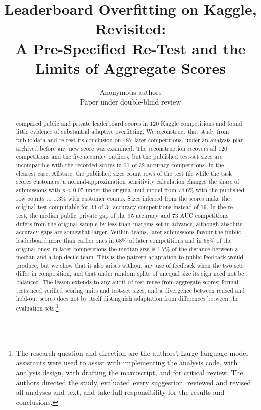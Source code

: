 \documentclass[10pt]{article}
\title{Leaderboard Overfitting on Kaggle, Revisited:\\ A Pre-Specified Re-Test and the Limits of Aggregate Scores}
\author{\name Anonymous authors \\ \addr Paper under double-blind review}
\begin{document}
\maketitle

\begin{abstract}
\citet{roelofs2019meta} compared public and private leaderboard scores in 120 Kaggle competitions and found little evidence of substantial adaptive overfitting. We reconstruct that study from public data and re-test its conclusion on 487 later competitions, under an analysis plan archived before any new score was examined. The reconstruction recovers all 120 competitions and the five accuracy outliers, but the published test-set sizes are incompatible with the recorded scores in 11 of 32 accuracy competitions. In the clearest case, Allstate, the published sizes count rows of the test file while the task scores customers; a normal-approximation sensitivity calculation changes the share of submissions with $p\le0.05$ under the original null model from 74.6\% with the published row counts to 1.3\% with customer counts. Sizes inferred from the scores make the original test computable for 33 of 34 accuracy competitions instead of 19. In the re-test, the median public--private gap of the 95 accuracy and 73 AUC competitions differs from the original sample by less than margins set in advance, although absolute accuracy gaps are somewhat larger. Within teams, later submissions favour the public leaderboard more than earlier ones in 68\% of later competitions and in 68\% of the original ones; in later competitions the median size is 1.7\% of the distance between a median and a top-decile team. This is the pattern adaptation to public feedback would produce, but we show that it also arises without any use of feedback when the two sets differ in composition, and that under random splits of unequal size its sign need not be balanced. The lesson extends to any audit of test reuse from aggregate scores: formal tests need verified scoring units and test-set sizes, and a divergence between reused and held-out scores does not by itself distinguish adaptation from differences between the evaluation sets.\footnote{The research question and direction are the authors'. Large language model assistants were used to assist with implementing the analysis code, with analysis design, with drafting the manuscript, and for critical review. The authors directed the study, evaluated every suggestion, reviewed and revised all analyses and text, and take full responsibility for the results and conclusions.}
\end{abstract}
\end{document}
